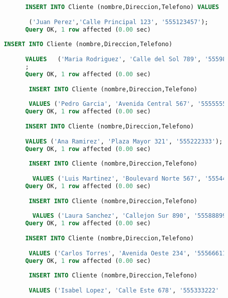 \documentclass{article}
\begin{document}
\begin{lstlisting}[language=SQL, caption=Crear base de datos competencia.]
               
               INSERT INTO Cliente (nombre,Direccion,Telefono) VALUES
               
                ('Juan Perez','Calle Principal 123', '555123457');
               Query OK, 1 row affected (0.00 sec)
               
         INSERT INTO Cliente (nombre,Direccion,Telefono) 
               
               VALUES   ('Maria Rodriguez', 'Calle del Sol 789', '555987654')
               ;
               Query OK, 1 row affected (0.00 sec)
               
                INSERT INTO Cliente (nombre,Direccion,Telefono) 
                
                VALUES ('Pedro Garcia', 'Avenida Central 567', '555555555');
               Query OK, 1 row affected (0.00 sec)
               
               INSERT INTO Cliente (nombre,Direccion,Telefono) 
               
               VALUES ('Ana Ramirez', 'Plaza Mayor 321', '555222333');
               Query OK, 1 row affected (0.00 sec)
               
                INSERT INTO Cliente (nombre,Direccion,Telefono)
                
                 VALUES ('Luis Martinez', 'Boulevard Norte 567', '555444777');
               Query OK, 1 row affected (0.00 sec)
               
                INSERT INTO Cliente (nombre,Direccion,Telefono)
                
                 VALUES ('Laura Sanchez', 'Callejon Sur 890', '555888999');
               Query OK, 1 row affected (0.00 sec)
               
               INSERT INTO Cliente (nombre,Direccion,Telefono)
               
                VALUES ('Carlos Torres', 'Avenida Oeste 234', '555666111');
               Query OK, 1 row affected (0.00 sec)
               
                INSERT INTO Cliente (nombre,Direccion,Telefono) 
                
                VALUES ('Isabel Lopez', 'Calle Este 678', '555333222'
                

\end{lstlisting}
\end{document}
